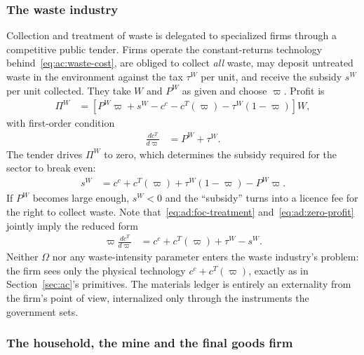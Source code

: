 \subsubsection{The waste industry}
\label{subsubsec:ad:waste}

Collection and treatment of waste is delegated to specialized firms through a competitive public tender. Firms operate the constant-returns technology behind~\eqref{eq:ac:waste-cost}, are obliged to collect \emph{all} waste, may deposit untreated waste in the environment against the tax $\tau^W$ per unit, and receive the subsidy $s^W$ per unit collected. They take $W$ and $P^W$ as given and choose $\varpi$. Profit is
\begin{align}
\Pi^W &= \left[P^W\varpi+s^W-c^c-c^T(\varpi)-\tau^W(1-\varpi)\right]W,
\label{eq:ad:waste-profit}
\end{align}
with first-order condition
\begin{align}
\frac{dc^T}{d\varpi} &= P^W+\tau^W.
\label{eq:ad:foc-treatment}
\end{align}
The tender drives $\Pi^W$ to zero, which determines the subsidy required for the sector to break even:
\begin{align}
s^W &= c^c+c^T(\varpi)+\tau^W(1-\varpi)-P^W\varpi.
\label{eq:ad:zero-profit}
\end{align}
If $P^W$ becomes large enough, $s^W<0$ and the ``subsidy'' turns into a licence fee for the right to collect waste. Note that~\eqref{eq:ad:foc-treatment} and~\eqref{eq:ad:zero-profit} jointly imply the reduced form
\begin{align}
\varpi\frac{dc^T}{d\varpi} &= c^c+c^T(\varpi)+\tau^W-s^W.
\label{eq:ad:treatment-reduced}
\end{align}
Neither $\Omega$ nor any waste-intensity parameter enters the waste industry's problem: the firm sees only the physical technology $c^c+c^T(\varpi)$, exactly as in Section~\ref{sec:ac}'s primitives. The materials ledger is entirely an externality from the firm's point of view, internalized only through the instruments the government sets.

\subsubsection{The household, the mine and the final goods firm}
\label{subsubsec:ad:household}

